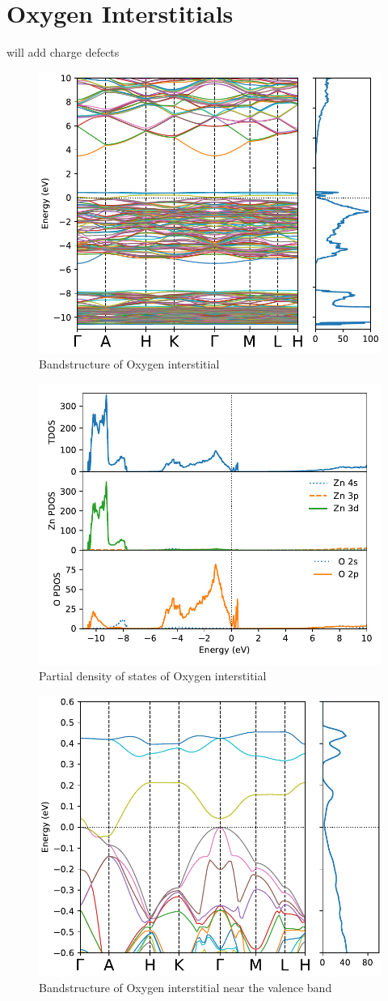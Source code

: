 \clearpage

\section{Oxygen Interstitials}
will add charge defects

\begin{figure}[tbh!]
	\centering
	\includegraphics[width=0.6\linewidth]{"images/rnd/band-dos_O_i"}
	\caption[Bandstructure of Oxygen interstitial]{Bandstructure of Oxygen interstitial}
\end{figure}

\begin{figure}[tbh!]
	\centering
	\includegraphics[width=0.6\linewidth]{"images/rnd/dos-pdos_O_i"}
	\caption[Partial density of states of Oxygen interstitial]{Partial density of states of Oxygen interstitial}
\end{figure}

\begin{figure}[tbh!]
	\centering
	\includegraphics[width=0.6\linewidth]{"images/rnd/band-dos-close_O_i"}
	\caption[Bandstructure of Oxygen interstitial near the valence band]{Bandstructure of Oxygen interstitial near the valence band}
\end{figure}

